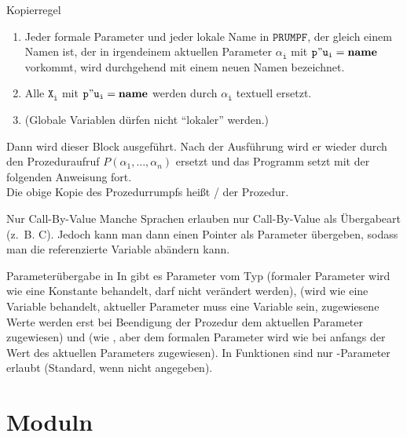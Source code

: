 \begin{Def}{Kopierregel}
\begin{enumerate}
        \item Jeder formale Parameter und jeder lokale Name in
        $\mathtt{PRUMPF}$, der gleich einem Namen ist, der in irgendeinem
        aktuellen Parameter $\mathtt{\alpha_i}$ mit
        $\mathtt{p"u_i = \mathbf{name}}$ vorkommt, wird durchgehend mit einem
        neuen Namen bezeichnet.

        \item Alle $\mathtt{X_i}$ mit $\mathtt{p"u_i = \mathbf{name}}$ werden
        durch $\mathtt{\alpha_i}$ textuell ersetzt.

        \item (Globale Variablen dürfen nicht "`lokaler"' werden.)
    \end{enumerate}

    Dann wird dieser Block ausgeführt.
    Nach der Ausführung wird er wieder durch den Prozeduraufruf
    $P(\alpha_1, \ldots, \alpha_n)$ ersetzt und das Programm setzt
    mit der folgenden Anweisung fort. \\
    Die obige Kopie des Prozedurrumpfs heißt
    / der Prozedur.
\end{Def}

\begin{Def}{Nur Call-By-Value}
    Manche Sprachen erlauben nur Call-By-Value als Übergabeart (z.~B. C).
    Jedoch kann man dann einen Pointer als Parameter übergeben, sodass
    man die referenzierte Variable abändern kann.
\end{Def}

\begin{Def}{Parameterübergabe in \Ada{}}
    In \Ada{} gibt es Parameter vom Typ  (formaler Parameter wird
    wie eine Konstante behandelt, darf nicht verändert werden), 
    (wird wie eine Variable behandelt, aktueller Parameter muss eine Variable
    sein, zugewiesene Werte werden erst bei Beendigung der Prozedur dem
    aktuellen Parameter zugewiesen) und 
    (wie , aber dem formalen Parameter
    wird wie bei  anfangs der Wert des aktuellen Parameters
    zugewiesen).
    In Funktionen sind nur -Parameter erlaubt
    (Standard, wenn nicht angegeben).
\end{Def}

\section{%
    Moduln%
}

